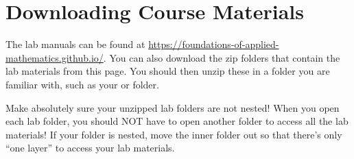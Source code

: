 \else  %
\section*{Downloading Course Materials}
The lab manuals can be found at \url{https://foundations-of-applied-mathematics.github.io/}.
You can also download the zip folders that contain the lab materials from this page.
You should then unzip these in a folder you are familiar with, such as your  or  folder.
\begin{warn}
Make absolutely sure your unzipped lab folders are not nested!
When you open each lab folder, you should NOT have to open another folder to access all the lab materials!
If your folder is nested, move the inner folder out so that there's only ``one layer'' to access your lab materials.
\end{warn}

\ifbootcamp
